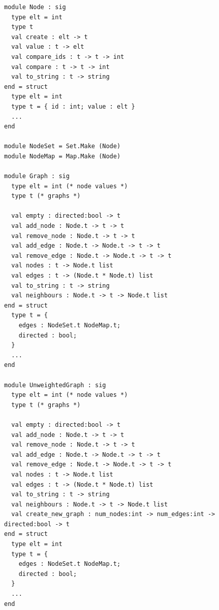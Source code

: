 \documentclass[mat1, tisk]{fmfdelo}
\begin{document}
\begin{lstlisting}
module Node : sig
  type elt = int
  type t
  val create : elt -> t
  val value : t -> elt
  val compare_ids : t -> t -> int
  val compare : t -> t -> int
  val to_string : t -> string
end = struct
  type elt = int
  type t = { id : int; value : elt }
  ...
end

module NodeSet = Set.Make (Node)
module NodeMap = Map.Make (Node)

module Graph : sig
  type elt = int (* node values *)
  type t (* graphs *)

  val empty : directed:bool -> t
  val add_node : Node.t -> t -> t
  val remove_node : Node.t -> t -> t
  val add_edge : Node.t -> Node.t -> t -> t
  val remove_edge : Node.t -> Node.t -> t -> t
  val nodes : t -> Node.t list
  val edges : t -> (Node.t * Node.t) list
  val to_string : t -> string
  val neighbours : Node.t -> t -> Node.t list
end = struct
  type t = {
    edges : NodeSet.t NodeMap.t;
    directed : bool;
  }
  ...
end

module UnweightedGraph : sig
  type elt = int (* node values *)
  type t (* graphs *)

  val empty : directed:bool -> t
  val add_node : Node.t -> t -> t
  val remove_node : Node.t -> t -> t
  val add_edge : Node.t -> Node.t -> t -> t
  val remove_edge : Node.t -> Node.t -> t -> t
  val nodes : t -> Node.t list
  val edges : t -> (Node.t * Node.t) list
  val to_string : t -> string
  val neighbours : Node.t -> t -> Node.t list
  val create_new_graph : num_nodes:int -> num_edges:int -> directed:bool -> t
end = struct
  type elt = int
  type t = {
    edges : NodeSet.t NodeMap.t;
    directed : bool;
  }
  ...
end

\end{lstlisting}
\end{document}
